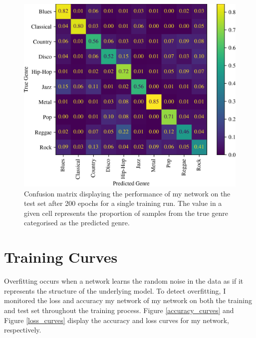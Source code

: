 \documentclass[conference]{IEEEtran}
\begin{document}
\begin{figure}[htbp]
    \centerline{\includegraphics[width=\columnwidth]{cm.png}}
    \caption{
        Confusion matrix displaying the performance of my network on the test set after 200 epochs for a single training run.    
        The value in a given cell represents the proportion of samples from the true genre categorised as the predicted genre.
    }
    \label{confusion_matrix}
\end{figure}

\section{Training Curves}

Overfitting occurs when a network learns the random noise in the data as if it represents the structure of the underlying model.
To detect overfitting, I monitored the loss and accuracy my network of my network on both the training and test set throughout the training process.
Figure \ref{accuracy_curves} and Figure \ref{loss_curves} display the accuracy and loss curves for my network, respectively.
\end{document}
